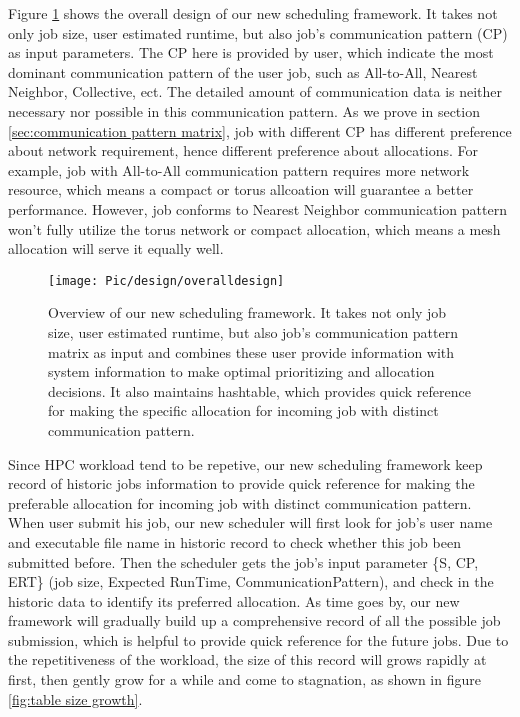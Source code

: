 \documentclass[conference]{IEEEtran}
\begin{document}
Figure \ref{fig:overall design} shows the overall design of our new scheduling framework. It takes not only job size, user estimated runtime, but also job's communication pattern (CP) as input parameters. The CP here is provided by user, which indicate the most dominant communication pattern of the user job, such as All-to-All, Nearest Neighbor, Collective, ect. The detailed amount of communication data is neither necessary nor possible in this communication pattern. As we prove in section \ref{sec:communication pattern matrix}, job with different CP has different preference about network requirement, hence different preference about allocations. For example, job with All-to-All communication pattern requires more network resource, which means a compact or torus allcoation will guarantee a better performance. However, job conforms to Nearest Neighbor communication pattern won't fully utilize the torus network or compact allocation, which means a mesh allocation will serve it equally well.


\begin{figure}[h!]     
\centering  
\texttt{[image: Pic/design/overalldesign]}  
\caption{Overview of our new scheduling framework. It takes not only job size, user estimated runtime, but also job's communication pattern matrix as input and combines these user provide information with system information to make optimal prioritizing and allocation decisions. It also maintains hashtable, which provides quick reference for making the specific allocation for incoming job with distinct communication pattern. }
\label{fig:overall design}
\end{figure}


Since HPC workload tend to be repetive, our new scheduling framework keep record of historic jobs information to provide quick reference for making the preferable allocation for incoming job with distinct communication pattern. When user submit his job, our new scheduler will first look for job's user name and executable file name in historic record to check whether this job been submitted before. Then the scheduler gets the job's input parameter \{S, CP, ERT\} (job size, Expected RunTime, CommunicationPattern),  and check in the historic data to identify its preferred allocation. As time goes by, our new framework will gradually build up a comprehensive record of all the possible job submission, which is helpful to provide quick reference for the future jobs. Due to the repetitiveness of the workload, the size of this record will grows rapidly at first, then gently grow for a while and come to stagnation, as shown in figure
\ref{fig:table size growth}. 
\end{document}
